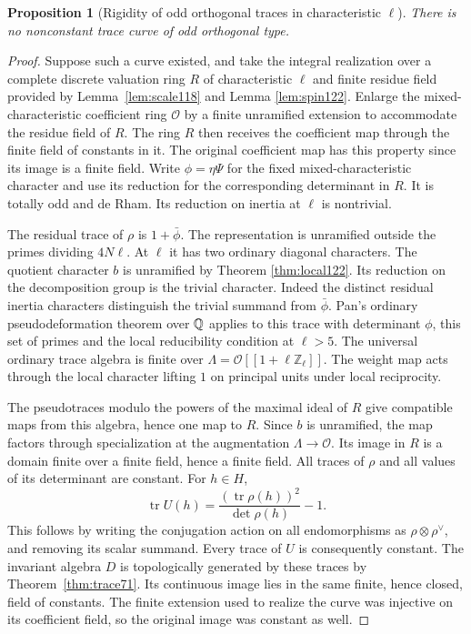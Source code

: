 \documentclass[a4paper,11pt]{article}
\newtheorem{proposition}{Proposition}[section]
\theoremstyle{definition}
\theoremstyle{remark}
\newcommand{\ZZ}{\mathbb Z}\newcommand{\ord}{\operatorname{ord}}
\numberwithin{equation}{section}
\begin{document}
\begin{proposition}[Rigidity of odd orthogonal traces in characteristic \(\ell\)]
\label{prop:oddcurve123}
There is no nonconstant trace curve of odd orthogonal type.
\end{proposition}
\begin{proof}
Suppose such a curve existed, and take the integral realization
over a complete discrete valuation ring \(R\) of characteristic
\(\ell\) and finite residue field provided by
Lemma~\ref{lem:scale118} and Lemma \ref{lem:spin122}. Enlarge the
mixed-characteristic coefficient ring \(\mathcal O\) by a finite
unramified extension to accommodate the residue field of \(R\).
The ring \(R\) then receives the coefficient map through the
finite field of constants in it. The original coefficient
map has this property since its image is a finite field.
Write \(\phi=\eta\Psi\) for the fixed mixed-characteristic
character and use its reduction for the corresponding determinant
in \(R\). It is totally odd and de Rham. Its reduction on
inertia at \(\ell\) is nontrivial.

The residual trace of \(\rho\) is \(1+\bar\phi\).
The representation is unramified outside the primes dividing
\(4N\ell\). At \(\ell\) it has two ordinary diagonal characters.
The quotient character \(b\) is unramified by
Theorem \ref{thm:local122}. Its reduction on the decomposition group is
the trivial character. Indeed the distinct residual inertia
characters distinguish the trivial summand from \(\bar\phi\).
Pan's ordinary pseudodeformation theorem over \(\mathbb Q\) applies
to this trace with determinant \(\phi\), this set of primes and
the local reducibility condition at \(\ell>5\).
The universal ordinary trace algebra is finite over
\(\Lambda=\mathcal O[[1+\ell\ZZ_\ell]]\). The weight map
acts through the local character lifting \(1\) on principal
units under local reciprocity.~\cite[Theorem 5.1.2(1)]{VI-IV-I-pan123}

The pseudotraces modulo the powers of the maximal ideal of
\(R\) give compatible maps from this algebra, hence one map
to \(R\). Since \(b\) is unramified, the map factors through
specialization at the augmentation \(\Lambda\to\mathcal O\).
Its image in \(R\) is a domain finite over a finite field,
hence a finite field. All traces of \(\rho\) and all values
of its determinant are constant. For \(h\in H\),
\[
 \operatorname{tr}U(h)
   =\frac{(\operatorname{tr}\rho(h))^2}{\det\rho(h)}-1 .
\]
This follows by writing the conjugation action on all
endomorphisms as \(\rho\otimes\rho^\vee\), and removing its
scalar summand. Every trace of \(U\) is consequently constant.
The invariant algebra \(D\) is topologically generated by
these traces by Theorem~\ref{thm:trace71}. Its continuous
image lies in the same finite, hence closed, field of constants.
The finite extension used to realize the curve was injective on
its coefficient field, so the original image was constant as well.
\end{proof}
\end{document}
